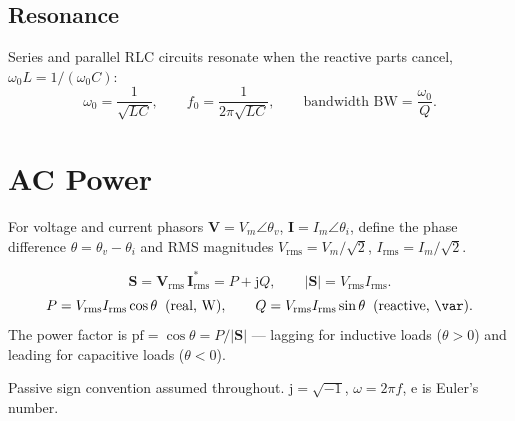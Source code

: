 \documentclass[11pt,a4paper]{article}
\newcommand{\ee}{\mathrm{e}}
\newcommand{\jj}{\mathrm{j}}
\begin{document}
\subsection{Resonance}
Series and parallel RLC circuits resonate when the reactive parts cancel,
$\omega_0 L = 1/(\omega_0 C)$:
\[
  \omega_0 = \frac{1}{\sqrt{LC}}, \qquad
  f_0 = \frac{1}{2\pi\sqrt{LC}}, \qquad
  \text{bandwidth } \mathrm{BW} = \frac{\omega_0}{Q}.
\]

\section{AC Power}

For voltage and current phasors $\mathbf{V}=V_m\angle\theta_v$,
$\mathbf{I}=I_m\angle\theta_i$, define the phase difference
$\theta = \theta_v - \theta_i$ and RMS magnitudes
$V_{\mathrm{rms}}=V_m/\sqrt2$, $I_{\mathrm{rms}}=I_m/\sqrt2$.

\[
  \mathbf{S} = \mathbf{V}_{\mathrm{rms}}\,\mathbf{I}_{\mathrm{rms}}^{*}
             = P + \jj Q,
  \qquad
  |\mathbf{S}| = V_{\mathrm{rms}} I_{\mathrm{rms}}.
\]
\[
  P = V_{\mathrm{rms}} I_{\mathrm{rms}}\cos\theta \;\;(\text{real, \si{\watt}}),
  \qquad
  Q = V_{\mathrm{rms}} I_{\mathrm{rms}}\sin\theta \;\;(\text{reactive, \si{\var}}).
\]
The power factor is $\mathrm{pf} = \cos\theta = P/|\mathbf{S}|$ --- lagging for
inductive loads ($\theta>0$) and leading for capacitive loads ($\theta<0$).

\vfill
\begin{center}
Passive sign convention assumed throughout.
$\jj=\sqrt{-1}$, \; $\omega = 2\pi f$, \; $\ee$ is Euler's number.
\end{center}
\end{document}
